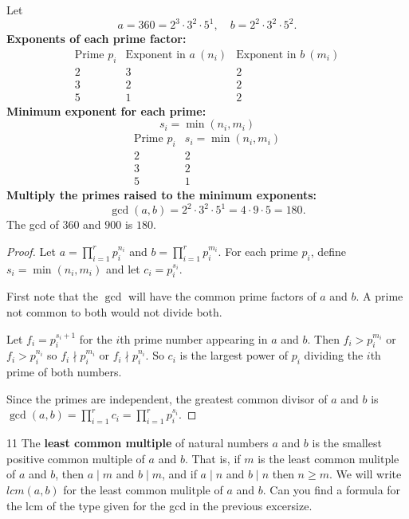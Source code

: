 Let 
\[
a = 360 = 2^3 \cdot 3^2 \cdot 5^1, \quad
b = 2^2 \cdot 3^2 \cdot 5^2.
\]
\textbf{Exponents of each prime factor:}
\[
\begin{array}{c|c|c}
\text{Prime } p_i & \text{Exponent in } a \ (n_i) & \text{Exponent in } b \ (m_i) \\
\hline
2 & 3 & 2 \\
3 & 2 & 2 \\
5 & 1 & 2
\end{array}
\]
\textbf{Minimum exponent for each prime:}
\[
s_i = \min(n_i, m_i)
\]
\[
\begin{array}{c|c}
\text{Prime } p_i & s_i = \min(n_i, m_i) \\
\hline
2 & 2 \\
3 & 2 \\
5 & 1
\end{array}
\]
\textbf{Multiply the primes raised to the minimum exponents:}
\[
\gcd(a,b) = 2^2 \cdot 3^2 \cdot 5^1 = 4 \cdot 9 \cdot 5 = 180.
\]
The gcd of $360$ and $900$ is $180$.

\begin{proof}
    Let $a = \prod_{i=1}^r p_i^{n_i}$ and $b = \prod_{i=1}^r p_i^{m_i}$.
    For each prime $p_i$, define $s_i = \min(n_i, m_i)$ and let $c_i = p_i^{s_i}$. 

    First note that the $\gcd$ will have the common prime factors of $a$ and $b$.
    A prime not common to both would not divide both.

    Let $f_i = p_i^{s_i + 1}$ for the $i$th prime number appearing in $a$ and $b$. 
    Then $f_i > p_i^{m_i}$ or $f_i > p_i^{n_i}$ so $f_i \nmid p_i^{m_i}$ or $f_i \nmid p_i^{n_i}$.
    So $c_i$ is the largest power of $p_i$ dividing the $i$th prime of both numbers.

    Since the primes are independent, the greatest common divisor of $a$ and $b$ is 
        $\gcd(a,b) = \prod_{i=1}^r c_i = \prod_{i=1}^r p_i^{s_i}$.
\end{proof}

\begin{problem}{11}
    The \textbf{least common multiple} of natural numbers $a$ and $b$
    is the smallest positive common multiple of $a$ and $b$. That is,
    if $m$ is the least common mulitple of $a$ and $b$, then $a \mid m$
    and $b \mid m$, and if $a \mid n$ and $b \mid n$ then $n \ge m$.
    We will write $lcm(a, b)$ for the least common mulitple of $a$ and $b$.
    Can you find a formula for the lcm of the type given for the gcd in 
    the previous excersize.
\end{problem}
\solved

